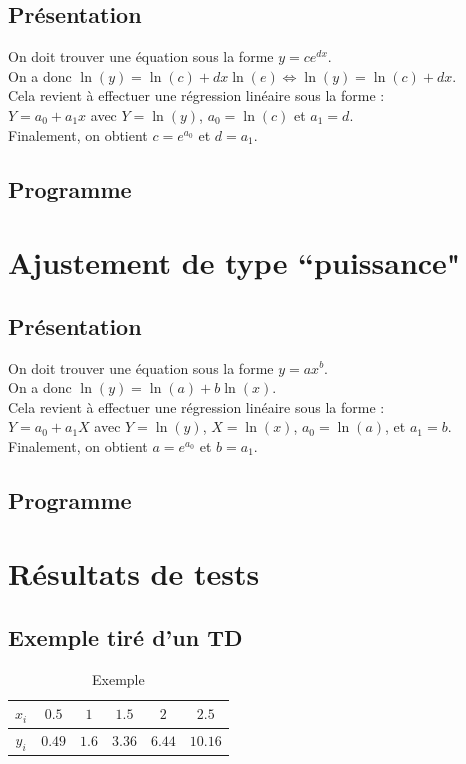 \documentclass{report}
\begin{document}
      \subsection{Présentation}
	\noindent On doit trouver une équation sous la forme $y=c e^{dx}$.\\
	On a donc  $\ln (y)=\ln(c)+dx\ln(e)\Leftrightarrow \ln(y)=\ln(c)+dx$.\\
	Cela revient à effectuer une régression linéaire sous la forme :\\
	$Y=a_{0} + a_{1}x$ avec $Y=\ln(y)$, $a_{0}=\ln(c)$ et $a_{1}=d$.\\
	Finalement, on obtient $c=e^{a_0}$ et $d=a_1$.
      \subsection{Programme}
	
    \newpage
    \section{Ajustement de type ``puissance"}
      \subsection{Présentation}
	\noindent On doit trouver une équation sous la forme $y=a x^{b}$.\\
	On a donc $\ln(y)=\ln(a) + b\ln(x)$.\\
	Cela revient à effectuer une régression linéaire sous la forme : \\
	$Y=a_{0} + a_{1}X$ avec $Y=\ln(y)$, $X=\ln(x)$, $a_{0}=\ln(a)$, et $a_{1}=b$.\\
	Finalement, on obtient $a=e^{a_0}$ et $b=a_1$.
      \subsection{Programme}
	
    \newpage
    \section{Résultats de tests}
      \subsection{Exemple tiré d'un TD}
	\begin{table}[h]
	  \centering
	  \begin{tabular}{| c | c | c | c | c | c |}
	    \hline 
	    $x_{i}$ & $0.5$ & $1$ & $1.5$ & $2$ & $2.5$ \\ 
	    \hline 
	    $y_{i}$ & $0.49$ & $1.6$ & $3.36$ & $6.44$ & $10.16$ \\ 
	    \hline 
	  \end{tabular}
	  \caption{Exemple}
	  \label{approx_td3_ex6}
	\end{table}
	
\end{document}
